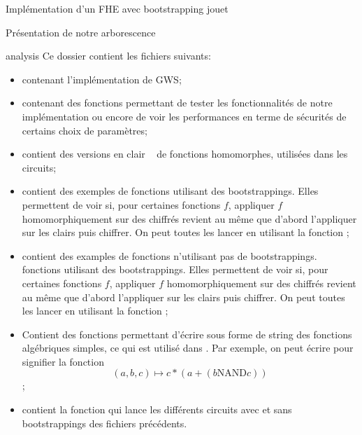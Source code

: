 \begin{section}{Implémentation d'un FHE avec bootstrapping \og{} jouet\fg~{}}
\begin{subsection}{Présentation de notre arborescence}
\begin{subsubsection}{analysis}
Ce dossier contient les fichiers suivants:
\begin{itemize}
\item {} contenant l'implémentation de GWS;
\item {} contenant des fonctions permettant 
	de tester les fonctionnalités de notre implémentation 
	ou encore de voir les performances 
	en terme de sécurités de certains choix de paramètres;
\item {} contient des versions \og en clair \fg~
	de fonctions homomorphes, utilisées dans les circuits;
\item {} contient des exemples de
	fonctions utilisant des bootstrappings. Elles permettent de voir 
	si, pour certaines fonctions $f$, appliquer $f$ homomorphiquement 
	sur des chiffrés revient au même que d'abord l'appliquer sur les 
	clairs puis chiffrer.
	On peut toutes les lancer en  
	utilisant  la fonction ;
\item {} contient des examples de
	fonctions n'utilisant pas de bootstrappings. 
	fonctions utilisant des bootstrappings. Elles permettent de voir 
	si, pour certaines fonctions $f$, appliquer $f$ homomorphiquement 
	sur des chiffrés revient au même que d'abord l'appliquer sur les 
	clairs puis chiffrer.
	On peut toutes les lancer en  
	utilisant  la fonction ;
\item {} Contient des fonctions permettant d'écrire 
	sous forme de string des fonctions algébriques simples, ce qui est utilisé
	dans  . Par exemple, on 
	peut écrire  pour signifier la fonction
	\[(a,b,c) \mapsto c * (a + (b \text{NAND} c)) \];
\item {} contient la fonction
	 qui lance les différents circuits avec et sans
	bootstrappings des fichiers précédents. 
\end{itemize}
\end{subsubsection} %


\end{subsection}
\end{section}
